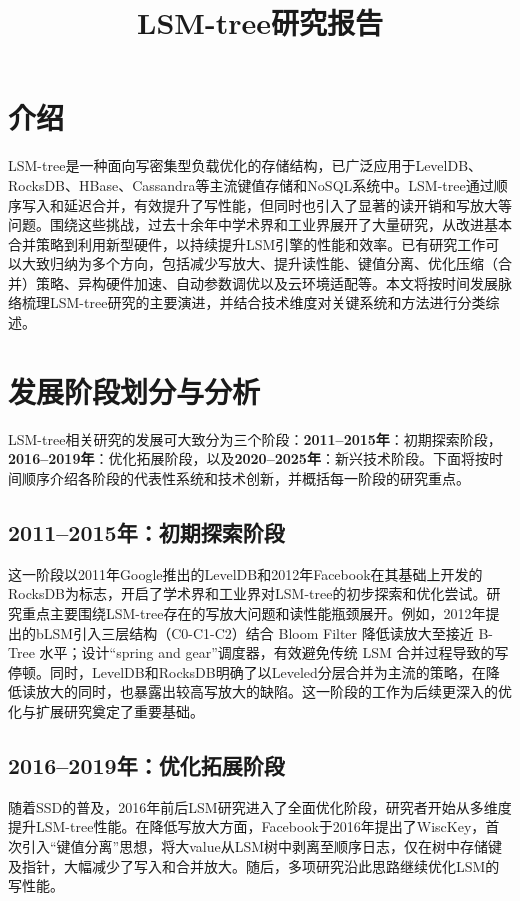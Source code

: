 \documentclass[lang=cn,11pt,a4paper]{elegantpaper}
\title{LSM-tree研究报告}
\date{\zhtoday}
\begin{document}
	
	\maketitle
	
	\section{介绍}
	LSM-tree是一种面向写密集型负载优化的存储结构，已广泛应用于LevelDB、RocksDB、HBase、Cassandra等主流键值存储和NoSQL系统中。LSM-tree通过顺序写入和延迟合并，有效提升了写性能，但同时也引入了显著的读开销和写放大等问题。围绕这些挑战，过去十余年中学术界和工业界展开了大量研究，从改进基本合并策略到利用新型硬件，以持续提升LSM引擎的性能和效率。已有研究工作可以大致归纳为多个方向，包括减少写放大、提升读性能、键值分离、优化压缩（合并）策略、异构硬件加速、自动参数调优以及云环境适配等。本文将按时间发展脉络梳理LSM-tree研究的主要演进，并结合技术维度对关键系统和方法进行分类综述。
	
	\section{发展阶段划分与分析}
	
	LSM-tree相关研究的发展可大致分为三个阶段：\textbf{2011–2015年}：初期探索阶段，\textbf{2016–2019年}：优化拓展阶段，以及\textbf{2020–2025年}：新兴技术阶段。下面将按时间顺序介绍各阶段的代表性系统和技术创新，并概括每一阶段的研究重点。
	
	\subsection{2011–2015年：初期探索阶段}
	
	这一阶段以2011年Google推出的LevelDB和2012年Facebook在其基础上开发的RocksDB为标志，开启了学术界和工业界对LSM-tree的初步探索和优化尝试。研究重点主要围绕LSM-tree存在的写放大问题和读性能瓶颈展开。例如，2012年提出的bLSM引入三层结构（C0-C1-C2）结合 Bloom Filter 降低读放大至接近 B-Tree 水平；设计“spring and gear”调度器，有效避免传统 LSM 合并过程导致的写停顿\cite{DBLP:conf/sigmod/SearsR12}。同时，LevelDB和RocksDB明确了以Leveled分层合并为主流的策略，在降低读放大的同时，也暴露出较高写放大的缺陷。这一阶段的工作为后续更深入的优化与扩展研究奠定了重要基础。
	
	\subsection{2016–2019年：优化拓展阶段}
	
	随着SSD的普及，2016年前后LSM研究进入了全面优化阶段，研究者开始从多维度提升LSM-tree性能。在降低写放大方面，Facebook于2016年提出了WiscKey，首次引入“键值分离”思想，将大value从LSM树中剥离至顺序日志，仅在树中存储键及指针，大幅减少了写入和合并放大\cite{DBLP:conf/fast/LuPAA16}。随后，多项研究沿此思路继续优化LSM的写性能。
	
\end{document}
